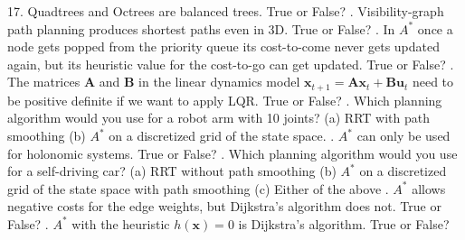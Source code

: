 \documentclass[a4paper,10pt]{article}
\begin{document}
17. Quadtrees and Octrees are balanced trees. True or False?
\newline
{}. Visibility-graph path planning produces shortest paths even in 3D. True or False?
\newline
{}. In $A^*$ once a node gets popped from the priority queue its cost-to-come never gets updated again, but its heuristic value for the cost-to-go can get updated. True or False?
\newline
{}. The matrices $\textbf{A}$ and $\textbf{B}$ in the linear dynamics model $\textbf{x}_{t+1}=\textbf{A}\textbf{x}_t+\textbf{B}\textbf{u}_t$ need to be 
positive definite if we want to apply LQR. True or False?
\newline
{}. Which planning algorithm would you use for a robot arm with 10 joints? 
\newline
(a) RRT with path smoothing
\newline
(b) $A^*$ on a discretized grid of the state space.
\newline
{}. $A^*$ can only be used for holonomic systems. True or False?
\newline
{}. Which planning algorithm would you use for a self-driving car?
\newline
(a) RRT without path smoothing
\newline
(b) $A^*$ on a discretized grid of the state space  with path smoothing
\newline
(c) Either of the above
\newline
{}. $A^*$ allows negative costs for the edge weights, but Dijkstra's algorithm does not. True or False?
\newline
{}. $A^*$ with the heuristic $h(\textbf{x})=0$ is Dijkstra's algorithm. True or False? 
\end{document}
